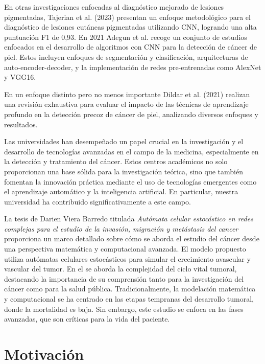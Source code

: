 En otras investigaciones enfocadas al diagnóstico mejorado de lesiones pigmentadas, Tajerian et al. (2023)  presentan un enfoque metodológico para el diagnóstico de lesiones cutáneas pigmentadas utilizando CNN, logrando una alta puntuación F1 de 0,93. En 2021 Adegun et al.  recoge un conjunto de estudios enfocados en el desarrollo de algoritmos con CNN para la detección de cáncer de piel. Estos incluyen enfoques de segmentación y clasificación, arquitecturas de auto-encoder-decoder, y la implementación de redes pre-entrenadas como AlexNet y VGG16.

En un enfoque distinto pero no menos importante Dildar et al. (2021)  realizan una revisión exhaustiva para evaluar el impacto de las técnicas de aprendizaje profundo en la detección precoz de cáncer de piel, analizando diversos enfoques y resultados.

Las universidades han desempeñado un papel crucial en la investigación y el desarrollo de tecnologías avanzadas en el campo de la medicina, especialmente en la detección y tratamiento del cáncer. Estos centros académicos no solo proporcionan una base sólida para la investigación teórica, sino que también fomentan la innovación práctica mediante el uso de tecnologías emergentes como el aprendizaje automático y la inteligencia artificial. En particular, nuestra universidad ha contribuido significativamente a este campo.

La tesis de Darien Viera Barredo titulada \textit{Autómata celular estocástico en redes complejas para el estudio de la invasión, migración y metástasis del cancer}  proporciona un marco detallado sobre cómo se aborda el estudio del cáncer desde una perspectiva matemática y computacional avanzada. El modelo propuesto utiliza autómatas celulares estocásticos para simular el crecimiento avascular y vascular del tumor. En el se aborda la complejidad del ciclo vital tumoral, destacando la importancia de su comprensión tanto para la investigación del cáncer como para la salud pública. Tradicionalmente, la modelación matemática y computacional se ha centrado en las etapas tempranas del desarrollo tumoral, donde la mortalidad es baja. Sin embargo, este estudio se enfoca en las fases avanzadas, que son críticas para la vida del paciente.

\section*{Motivación}


